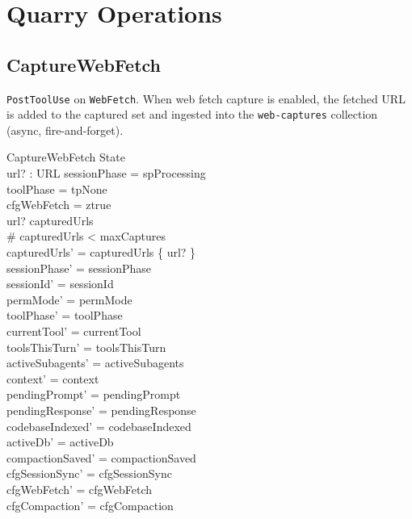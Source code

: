 \documentclass[a4paper,10pt,fleqn]{article}
\begin{document}
\section{Quarry Operations}

\subsection{CaptureWebFetch}

\texttt{PostToolUse} on \texttt{WebFetch}. When web fetch capture
is enabled, the fetched URL is added to the captured set and
ingested into the \texttt{web-captures} collection (async,
fire-and-forget).

\begin{schema}{CaptureWebFetch}
  \Delta State \\
  url? : URL
  \where
  sessionPhase = spProcessing \\
  toolPhase = tpNone \\
  cfgWebFetch = ztrue \\
  url? \notin capturedUrls \\
  \# capturedUrls < maxCaptures \\
  capturedUrls' = capturedUrls \cup \{ url? \} \\
  sessionPhase' = sessionPhase \\
  sessionId' = sessionId \\
  permMode' = permMode \\
  toolPhase' = toolPhase \\
  currentTool' = currentTool \\
  toolsThisTurn' = toolsThisTurn \\
  activeSubagents' = activeSubagents \\
  context' = context \\
  pendingPrompt' = pendingPrompt \\
  pendingResponse' = pendingResponse \\
  codebaseIndexed' = codebaseIndexed \\
  activeDb' = activeDb \\
  compactionSaved' = compactionSaved \\
  cfgSessionSync' = cfgSessionSync \\
  cfgWebFetch' = cfgWebFetch \\
  cfgCompaction' = cfgCompaction
\end{schema}
\end{document}
